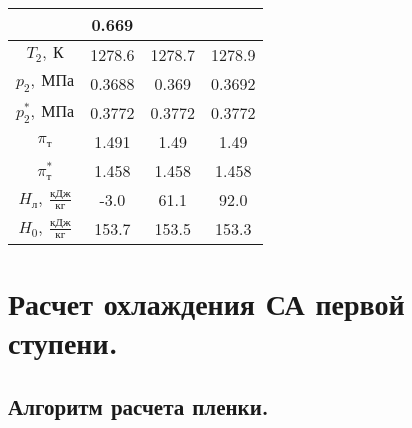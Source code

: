 \documentclass[a4paper,10pt]{article}
\begin{document}
\begin{longtable}{
    |
%    
    c|
%    
    c|
%    
    c|
%    
    c|
%    
    }
%        
        & 0.669
%        
        \\
        \hline
%        
        $T_2,\ К$
%        
        & 1278.6
%        
        & 1278.7
%        
        & 1278.9
%        
        \\
        \hline
%        
        $p_2,\ МПа$
%        
        & 0.3688
%        
        & 0.369
%        
        & 0.3692
%        
        \\
        \hline
%        
        $p_2^*,\ МПа$
%        
        & 0.3772
%        
        & 0.3772
%        
        & 0.3772
%        
        \\
        \hline
%        
        $\pi_т$
%        
        & 1.491
%        
        & 1.49
%        
        & 1.49
%        
        \\
        \hline
%        
        $\pi_т^*$
%        
        & 1.458
%        
        & 1.458
%        
        & 1.458
%        
        \\
        \hline
%        
        $H_л,\ \frac{кДж}{кг}$
%        
        & -3.0
%        
        & 61.1
%        
        & 92.0
%        
        \\
        \hline
%        
        $H_0,\ \frac{кДж}{кг}$
%        
        & 153.7
%        
        & 153.5
%        
        & 153.3
%        
        \\
        \hline
%        

    \end{longtable}

%        

    \section{Расчет охлаждения СА первой ступени.}

    \subsection{Алгоритм расчета пленки.}

    
\end{document}
